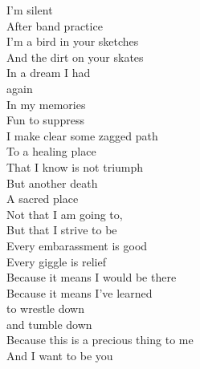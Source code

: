 I'm silent\\
After band practice\\
I'm a bird in your sketches\\
And the dirt on your skates\\
In a dream I had\\
again\\
In my memories\\
Fun to suppress\\
I make clear some zagged path\\
To a healing place\\
That I know is not triumph\\
But another death\\
A sacred place\\
Not that I am going to,\\
But that I strive to be\\
Every embarassment is good\\
Every giggle is relief\\
Because it means I would be there\\
Because it means I've learned\\
to wrestle down\\
and tumble down\\
Because this is a precious thing to me\\
And I want to be you\\

